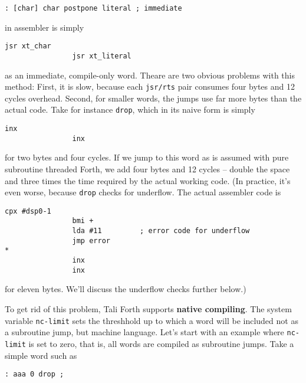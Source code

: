 \begin{lstlisting}[frame=lines]
        : [char] char postpone literal ; immediate
\end{lstlisting}

\noindent in assembler is simply

\begin{lstlisting}[frame=lines]
                jsr xt_char
                jsr xt_literal
\end{lstlisting}

\noindent as an immediate, compile-only word. Theare are two obvious problems
with this method: First, it is slow, because each \texttt{jsr/rts} pair consumes
four bytes and 12 cycles overhead. Second, for smaller words, the jumps use far
more bytes than the actual code. Take for instance
\texttt{drop}, which in its naive form is simply

\begin{lstlisting}[frame=lines]
                inx
                inx
\end{lstlisting}

\noindent for two bytes and four cycles. If we jump to this word as is assumed
with pure subroutine threaded Forth, we add four bytes and 12 cycles -- double
the space and three times the time required by the actual working code. (In
practice, it's even worse, because \texttt{drop} checks for
underflow. The actual assembler code is

\begin{lstlisting}[frame=lines]
                cpx #dsp0-1
                bmi +
                lda #11         ; error code for underflow
                jmp error
*
                inx
                inx
\end{lstlisting}

\noindent for eleven bytes. We'll discuss the underflow checks further below.)

To get rid of this problem, Tali Forth supports \textbf{native
compiling}. The system variable
\texttt{nc-limit} sets
the threshhold up to which a word will be included not as a subroutine jump, but
machine language. Let's start with an example where \texttt{nc-limit} is set to
zero, that is, all words are compiled as subroutine jumps. Take a simple word
such as

\begin{lstlisting}[frame=lines]
        : aaa 0 drop ;
\end{lstlisting}

